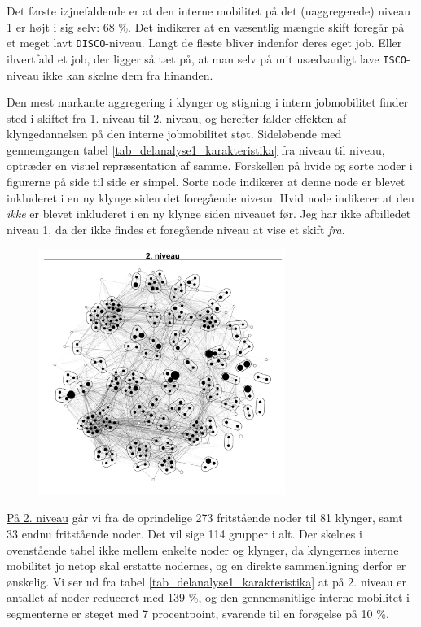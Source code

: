 Det første iøjnefaldende er at den interne mobilitet på det (uaggregerede) niveau 1 er højt i sig selv: 68 \%. Det indikerer at en væsentlig mængde skift foregår på et meget lavt \texttt{DISCO}-niveau. Langt de fleste bliver indenfor deres eget job. Eller ihvertfald et job, der ligger så tæt på, at man selv på mit usædvanligt lave \texttt{ISCO}-niveau ikke kan skelne dem fra hinanden.

Den mest markante aggregering i klynger og stigning i intern jobmobilitet finder sted i skiftet fra 1. niveau til 2. niveau, og herefter falder effekten af klyngedannelsen på den interne jobmobilitet støt. Sideløbende med gennemgangen tabel \ref{tab_delanalyse1_karakteristika} fra niveau til niveau, optræder en visuel repræsentation af samme. Forskellen på hvide og sorte noder i figurerne på side \pageref{fig_delanalyse1_kort_seg_proces2} til side \pageref{fig_delanalyse1_kort_seg_proces5} er simpel. Sorte node indikerer at denne node er blevet inkluderet i en ny klynge siden det foregående niveau. Hvid node indikerer at den \emph{ikke} er blevet inkluderet i en ny klynge siden niveauet før. 
Jeg har ikke afbilledet niveau 1, da der ikke findes et foregående niveau at vise et skift \emph{fra}. 

\begin{figure}
  \vspace{-20pt}
  \begin{center}
   \caption{}
   \label{fig_delanalyse1_kort_seg_proces2}
    \includegraphics[width=8cm]{fig/netvaerkskort/kort_seg_proces2.pdf}
  \end{center}
  \vspace{-20pt}
\end{figure}
%

\underline{På 2. niveau} går vi fra de oprindelige 273 fritstående noder til 81 klynger, samt 33 endnu fritstående noder. Det vil sige 114 grupper i alt. Der skelnes i ovenstående tabel ikke mellem enkelte noder og klynger, da klyngernes interne mobilitet jo netop skal erstatte nodernes, og en direkte sammenligning derfor er ønskelig.
Vi ser ud fra tabel \ref{tab_delanalyse1_karakteristika} at på 2. niveau er antallet af noder reduceret med 139 \%, og den gennemsnitlige interne mobilitet i segmenterne er steget med 7 procentpoint, svarende til en forøgelse på 10 \%. 

